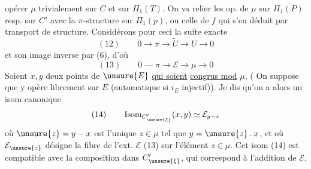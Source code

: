 opérer $\mu$ trivialement sur $C$ et sur $\Pi_1(T)$.
On va relier les op. de $\mu$ sur $\Pi_1(P)$
resp. sur $C'$ avec la $\pi$-structure sur
$\Pi_1(p)$, ou celle de $f$ qui s'en déduit
par transport de structure. Considérons
pour ceci la suite exacte
\[
(12)\qquad 0\longrightarrow\pi\longrightarrow\widetilde U\longrightarrow U\longrightarrow0
\]
et son image inverse par (6), d'où
\[
(13)\qquad 0\mathbin{\text{---}}\pi\longrightarrow\mathcal E\longrightarrow\mu\longrightarrow0
\]
Soient $x,y$ deux points de $\unsure{E}$ \uline{qui soient}
\uline{congrus mod} $\mu$,
( On suppose que  \unsure{$\mu$} y
opère librement sur $E$ (automatique si $i_E$ injectif)).
Je dis qu'on a alors un isom canonique
\[
(14)\qquad \operatorname{Isom}_{C'_{\unsure{\xi}}}(x,y)\simeq\mathcal E_{y-x}
\]
où $\unsure{z}=y-x$ est l'unique $z\in\mu$ tel que
$y=\unsure{z}\mathbin{.}x$, et où $\mathcal E_{\unsure{z}}$ désigne la fibre de
l'ext. $\mathcal E$ (13) sur l'élément $z\in\mu$. Cet
isom (14) est compatible avec la composition
dans $C'_{\unsure{\xi}}$, qui correspond à l'addition de $\mathcal E$.
